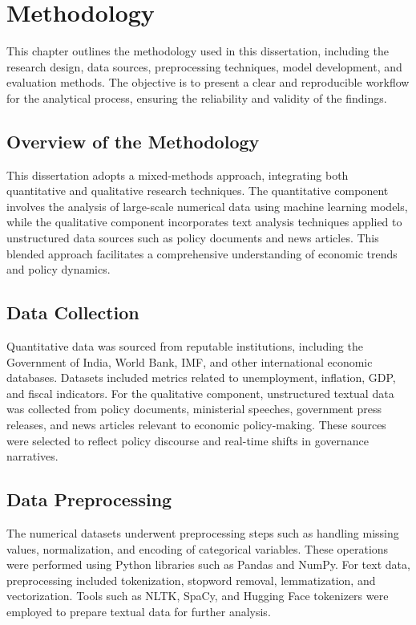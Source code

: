 \chapter{Methodology}
\justifying
\label{chap:methodology}

This chapter outlines the methodology used in this dissertation, including the research design, data sources, preprocessing techniques, model development, and evaluation methods. The objective is to present a clear and reproducible workflow for the analytical process, ensuring the reliability and validity of the findings.

\section{Overview of the Methodology}
\label{sec:overview-methodology}
This dissertation adopts a mixed-methods approach, integrating both quantitative and qualitative research techniques. The quantitative component involves the analysis of large-scale numerical data using machine learning models, while the qualitative component incorporates text analysis techniques applied to unstructured data sources such as policy documents and news articles. This blended approach facilitates a comprehensive understanding of economic trends and policy dynamics.

\section{Data Collection}
\label{sec:data-collection}
Quantitative data was sourced from reputable institutions, including the Government of India, World Bank, IMF, and other international economic databases. Datasets included metrics related to unemployment, inflation, GDP, and fiscal indicators.
For the qualitative component, unstructured textual data was collected from policy documents, ministerial speeches, government press releases, and news articles relevant to economic policy-making. These sources were selected to reflect policy discourse and real-time shifts in governance narratives.

\section{Data Preprocessing}
\label{sec:data-preprocessing}
The numerical datasets underwent preprocessing steps such as handling missing values, normalization, and encoding of categorical variables. These operations were performed using Python libraries such as Pandas and NumPy.
For text data, preprocessing included tokenization, stopword removal, lemmatization, and vectorization. Tools such as NLTK, SpaCy, and Hugging Face tokenizers were employed to prepare textual data for further analysis.


